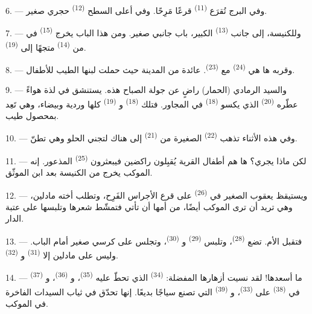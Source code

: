 6. --- وفي البرج تُقرَع  \textsuperscript{(11)} قرعًا مَرِحًا.
وفي أعلى السطح  \textsuperscript{(12)} حجري صغير.

7. --- وللكنيسة، إلى جانب  \textsuperscript{(13)} الكبير، باب
جانبي صغير. ومن هذا الباب يخرج  \textsuperscript{(15)} في
 من  \textsuperscript{(14)} متجهًا إلى
 \textsuperscript{(19)}.

8. --- وقربه ها هي  \textsuperscript{(24)} مع 
\textsuperscript{(23)}. عائدة من المدينة حيث حملت لبنها الطيب للأطفال.

\VUsaut{4.0mm}
\VUsaut{3.4mm}

9. --- والسيد الرمادي (الحمار) راضٍ عن جولة الصباح هذه. يستنشق في لذة
هواءً عطّره  \textsuperscript{(20)} الذي يكسو  \textsuperscript{(18)} في  المجاور. فتلك
 \textsuperscript{(18)} و
\textsuperscript{(19)} كلها وردية وبيضاء، وهي تَعِد بمحصول طيب.

10. --- وفي هذه الأثناء تذهب  \textsuperscript{(22)} الصغيرة من
 \textsuperscript{(21)} إلى هناك لتجني  الحلو وهي
تطنّ.

11. --- لكن ماذا يجري؟ ها هم أطفال القرية يُقبِلون راكضين فيبعثرون
 \textsuperscript{(25)} المذعور. إنه الموكب يخرج من الكنيسة بعد
 ابن الموثّق.

12. --- ويستيقظ يعقوب الصغير في  \textsuperscript{(26)} على قرع
الأجراس الفَرِح، وتطلب أخته مادلين، وهي تريد أن ترى الموكب أيضًا، من أمها
أن تأتي فتمشّط شعرها وتلبسها على عتبة الدار.

13. --- فتقبل الأم. تضع  \textsuperscript{(28)}، وتلبس
 \textsuperscript{(29)} و \textsuperscript{(30)}،
وتجلس على كرسي صغير أمام الباب. وليس على مادلين إلا  \textsuperscript{(31)} و \textsuperscript{(32)}.

14. --- ما أسعدها! لقد نسيت أزهارها المفضلة: 
\textsuperscript{(34)} الذي تحطّ عليه  \textsuperscript{(35)}،
و \textsuperscript{(36)}، و
\textsuperscript{(37)} في  \textsuperscript{(38)} على 
\textsuperscript{(33)}، و \textsuperscript{(39)} التي تصنع سياجًا
بديعًا. إنها تحدّق في ثياب السيدات الفاخرة في الموكب.

